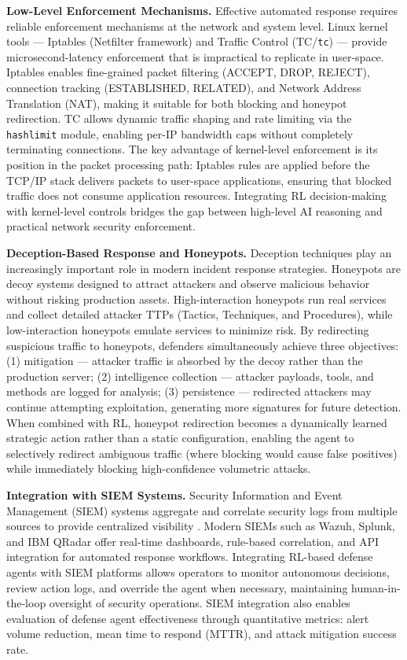 \documentclass[12pt,a4paper]{report}
\begin{document}
\textbf{Low-Level Enforcement Mechanisms.} Effective automated response requires reliable enforcement mechanisms at the network and system level. Linux kernel tools --- Iptables (Netfilter framework) and Traffic Control (TC/\texttt{tc}) --- provide microsecond-latency enforcement that is impractical to replicate in user-space. Iptables enables fine-grained packet filtering (ACCEPT, DROP, REJECT), connection tracking (ESTABLISHED, RELATED), and Network Address Translation (NAT), making it suitable for both blocking and honeypot redirection. TC allows dynamic traffic shaping and rate limiting via the \texttt{hashlimit} module, enabling per-IP bandwidth caps without completely terminating connections. The key advantage of kernel-level enforcement is its position in the packet processing path: Iptables rules are applied before the TCP/IP stack delivers packets to user-space applications, ensuring that blocked traffic does not consume application resources. Integrating RL decision-making with kernel-level controls bridges the gap between high-level AI reasoning and practical network security enforcement.

\textbf{Deception-Based Response and Honeypots.} Deception techniques play an increasingly important role in modern incident response strategies. Honeypots \cite{honeypotSurvey2021} are decoy systems designed to attract attackers and observe malicious behavior without risking production assets. High-interaction honeypots run real services and collect detailed attacker TTPs (Tactics, Techniques, and Procedures), while low-interaction honeypots emulate services to minimize risk. By redirecting suspicious traffic to honeypots, defenders simultaneously achieve three objectives: (1) mitigation --- attacker traffic is absorbed by the decoy rather than the production server; (2) intelligence collection --- attacker payloads, tools, and methods are logged for analysis; (3) persistence --- redirected attackers may continue attempting exploitation, generating more signatures for future detection. When combined with RL, honeypot redirection becomes a dynamically learned strategic action rather than a static configuration, enabling the agent to selectively redirect ambiguous traffic (where blocking would cause false positives) while immediately blocking high-confidence volumetric attacks.

\textbf{Integration with SIEM Systems.} Security Information and Event Management (SIEM) systems aggregate and correlate security logs from multiple sources to provide centralized visibility \cite{ibmSOAR2023}. Modern SIEMs such as Wazuh, Splunk, and IBM QRadar offer real-time dashboards, rule-based correlation, and API integration for automated response workflows. Integrating RL-based defense agents with SIEM platforms allows operators to monitor autonomous decisions, review action logs, and override the agent when necessary, maintaining human-in-the-loop oversight of security operations. SIEM integration also enables evaluation of defense agent effectiveness through quantitative metrics: alert volume reduction, mean time to respond (MTTR), and attack mitigation success rate.
\end{document}
